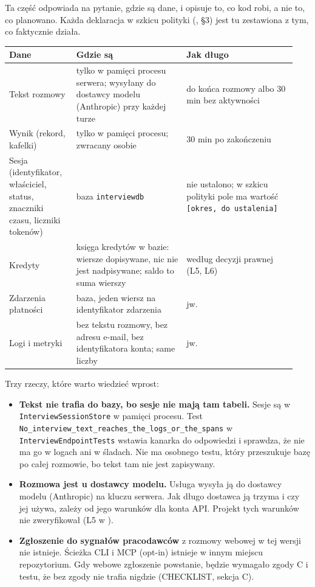 {Ta część odpowiada na pytanie, gdzie są dane, i opisuje to, co kod robi, a
nie to, co planowano. Każda deklaracja w szkicu polityki
(, §3) jest tu zestawiona z tym, co
faktycznie działa.

\begin{longtable}{@{}p{0.22\linewidth}p{0.36\linewidth}p{0.36\linewidth}@{}}
\toprule
Dane & Gdzie są & Jak długo \\
\midrule
\endhead
Tekst rozmowy & tylko w pamięci procesu serwera; wysyłany do dostawcy modelu
(Anthropic) przy każdej turze & do końca rozmowy albo 30 min bez aktywności \\
Wynik (rekord, kafelki) & tylko w pamięci procesu; zwracany osobie & 30 min po
zakończeniu \\
Sesja (identyfikator, właściciel, status, znaczniki czasu, liczniki tokenów) &
baza \texttt{interviewdb} & nie ustalono; w szkicu polityki pole ma wartość
\texttt{[okres, do ustalenia]} \\
Kredyty & księga kredytów w bazie: wiersze dopisywane, nic nie jest
nadpisywane; saldo to suma wierszy & według decyzji prawnej (L5, L6) \\
Zdarzenia płatności & baza, jeden wiersz na identyfikator zdarzenia & jw. \\
Logi i metryki & bez tekstu rozmowy, bez adresu e-mail, bez identyfikatora
konta; same liczby & jw. \\
\bottomrule
\end{longtable}

Trzy rzeczy, które warto wiedzieć wprost:

\begin{itemize}[leftmargin=*,itemsep=2pt]
  \item \textbf{Tekst nie trafia do bazy, bo sesje nie mają tam tabeli.} Sesje
        są w \texttt{InterviewSessionStore} w pamięci procesu. Test
        \texttt{No\_\allowbreak{}interview\_\allowbreak{}text\_\allowbreak{}reaches\_\allowbreak{}the\_\allowbreak{}logs\_\allowbreak{}or\_\allowbreak{}the\_\allowbreak{}spans} w
        \texttt{InterviewEndpointTests} wstawia kanarka do odpowiedzi i sprawdza,
        że nie ma go w logach ani w śladach. Nie ma osobnego testu, który
        przeszukuje bazę po całej rozmowie, bo tekst tam nie jest zapisywany.
  \item \textbf{Rozmowa jest u dostawcy modelu.} Usługa wysyła ją do dostawcy
        modelu (Anthropic) na kluczu serwera. Jak długo dostawca ją trzyma i czy
        jej używa, zależy od jego warunków dla konta API. Projekt tych warunków
        nie zweryfikował (L5 w ).
  \item \textbf{Zgłoszenie do sygnałów pracodawców} z rozmowy webowej w tej
        wersji nie istnieje. Ścieżka CLI i MCP (opt-in) istnieje w innym miejscu
        repozytorium. Gdy webowe zgłoszenie powstanie, będzie wymagało zgody C
        i testu, że bez zgody nie trafia nigdzie (CHECKLIST, sekcja C).
\end{itemize}

}
